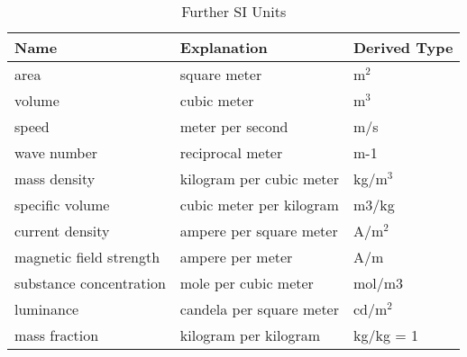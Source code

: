 \begin{table}[h]\HHHH\LLLL
  \centering
\begin{tabular}{|lll|} \hline
Name   &  Explanation & Derived Type \\ \hline
area                               & square meter                &    m$^2$ \\
volume                             & cubic meter                 &    m$^3$ \\
speed                              & meter per second            &    m/s \\
wave number                        & reciprocal meter            &    m-1 \\
mass density                       & kilogram per cubic meter    &    kg/m$^3$ \\
specific volume                    & cubic meter per kilogram    &    m3/kg \\
current density                    & ampere per square meter     &    A/m$^2$ \\
magnetic field strength            & ampere per meter            &    A/m \\
substance concentration            & mole per cubic meter        &    mol/m$3$ \\
luminance                          & candela per square meter    &    cd/m$^2$ \\
mass fraction                      & kilogram per kilogram       &    kg/kg = 1 \\ \hline
\end{tabular}
  \caption{\HHHH Further SI Units}
  \label{table:3}
\end{table}
\mnewfoil
\noindent
{}

\noindent
{}

\pos{\scriptsize}{\large\HHHH\LLLL}

